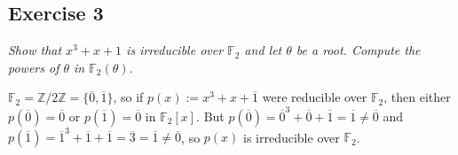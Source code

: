 \subsection*{Exercise 3}
\begin{framed}
\textit{Show that $x^3 + x + 1$ is irreducible over $\mathbb{F}_2$ and let $\theta$ be a root. Compute the powers of $\theta$ in $\mathbb{F}_2(\theta)$.}
\end{framed}

$\mathbb{F}_2 = \mathbb{Z}/2\mathbb{Z} = \{\overline{0}, \overline{1}\}$, so if $p(x) := x^3 + x + \overline{1}$ were reducible over $\mathbb{F}_2$, then either $p(\overline{0}) = \overline{0}$ or $p(\overline{1}) = \overline{0}$ in $\mathbb{F}_2[x]$. But $p(\overline{0}) = \overline{0}^3 + \overline{0} + \overline{1} = \overline{1} \not= \overline{0}$ and $p(\overline{1}) = \overline{1}^3 + \overline{1} + \overline{1} = \overline{3} = \overline{1} \not= \overline{0}$, so $p(x)$ is irreducible over $\mathbb{F}_2$.

